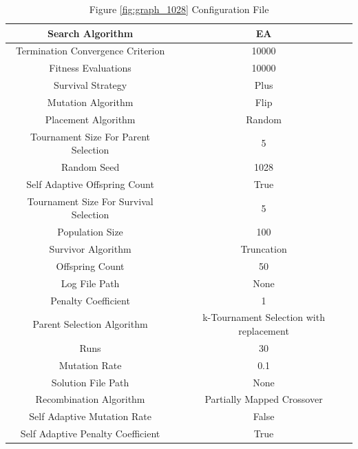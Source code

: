 \documentclass{standalone}
\begin{document}
\begin{table}[!htb]
	\centering
	\caption{Figure \ref{fig:graph_1028} Configuration File}
	\label{tab:graph_1028}
	\begin{tabular}{| c | c |}
		\hline
		Search Algorithm		& EA		 \\
		\hline
		Termination Convergence Criterion		& 10000		 \\
		\hline
		Fitness Evaluations		& 10000		 \\
		\hline
		Survival Strategy		& Plus		 \\
		\hline
		Mutation Algorithm		& Flip		 \\
		\hline
		Placement Algorithm		& Random		 \\
		\hline
		Tournament Size For Parent Selection		& 5		 \\
		\hline
		Random Seed		& 1028		 \\
		\hline
		Self Adaptive Offspring Count		& True		 \\
		\hline
		Tournament Size For Survival Selection		& 5		 \\
		\hline
		Population Size		& 100		 \\
		\hline
		Survivor Algorithm		& Truncation		 \\
		\hline
		Offspring Count		& 50		 \\
		\hline
		Log File Path		& None		 \\
		\hline
		Penalty Coefficient		& 1		 \\
		\hline
		Parent Selection Algorithm		& k-Tournament Selection with replacement		 \\
		\hline
		Runs		& 30		 \\
		\hline
		Mutation Rate		& 0.1		 \\
		\hline
		Solution File Path		& None		 \\
		\hline
		Recombination Algorithm		& Partially Mapped Crossover		 \\
		\hline
		Self Adaptive Mutation Rate		& False		 \\
		\hline
		Self Adaptive Penalty Coefficient		& True		 \\
		\hline
	\end{tabular}
\end{table}
\end{document}
